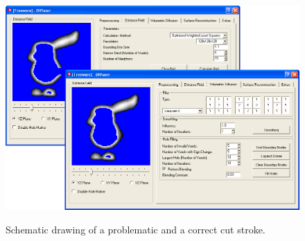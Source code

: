 \begin{figure}[!h]
    \centering
    \includegraphics[width=0.7260\linewidth]{figures/voldiff_ui}\\
    \caption[Schematic drawing of a problematic cut stroke]{Schematic drawing of a problematic and a correct cut stroke.
      \label{fig:schematiccut}}
\end{figure}

